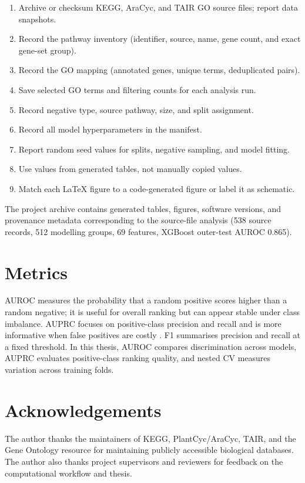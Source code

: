 \documentclass[12pt,letterpaper,oneside,openany]{book}
\begin{document}
\begin{enumerate}[leftmargin=*]
  \item Archive or checksum KEGG, AraCyc, and TAIR GO source files; report data snapshots.
  \item Record the pathway inventory (identifier, source, name, gene count, and exact gene-set group).
  \item Record the GO mapping (annotated genes, unique terms, deduplicated pairs).
  \item Save selected GO terms and filtering counts for each analysis run.
  \item Record negative type, source pathway, size, and split assignment.
  \item Record all model hyperparameters in the manifest.
  \item Report random seed values for splits, negative sampling, and model fitting.
  \item Use values from generated tables, not manually copied values.
  \item Match each LaTeX figure to a code-generated figure or label it as schematic.
\end{enumerate}

The project archive contains generated tables, figures, software versions, and provenance metadata corresponding to the source-file analysis (538 source records, 512 modelling groups, 69 features, XGBoost outer-test AUROC 0.865).

\chapter{Metrics}
\label{app:metrics}

AUROC measures the probability that a random positive scores higher than a random negative; it is useful for overall ranking but can appear stable under class imbalance. AUPRC focuses on positive-class precision and recall and is more informative when false positives are costly \citep{saito2015precision}. F1 summarises precision and recall at a fixed threshold. In this thesis, AUROC compares discrimination across models, AUPRC evaluates positive-class ranking quality, and nested CV measures variation across training folds.


\chapter*{Acknowledgements}
The author thanks the maintainers of KEGG, PlantCyc/AraCyc, TAIR, and the Gene Ontology resource for maintaining publicly accessible biological databases. The author also thanks project supervisors and reviewers for feedback on the computational workflow and thesis.
\end{document}
